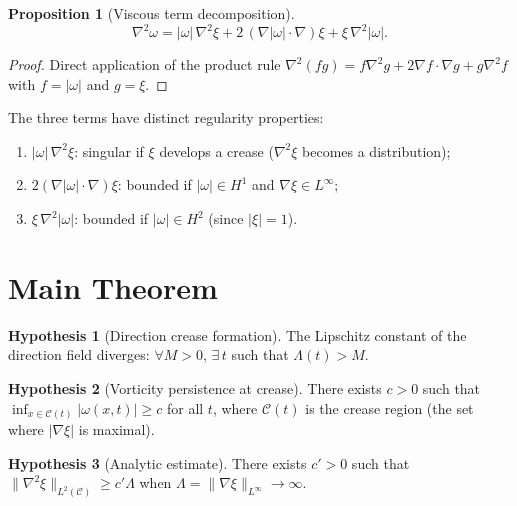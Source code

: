 \documentclass[11pt,a4paper]{article}
\newtheorem{proposition}[theorem]{Proposition}
\theoremstyle{definition}
\newtheorem{hypothesis}{Hypothesis}
\newcommand{\grad}{\nabla}
\newcommand{\lapl}{\nabla^2}
\newcommand{\norm}[1]{\lVert #1 \rVert}
\newcommand{\abs}[1]{\lvert #1 \rvert}
\begin{document}
\begin{proposition}[Viscous term decomposition]\label{prop:product}
\begin{equation}\label{eq:product}
  \lapl\omega
    = \abs{\omega}\,\lapl\xi
    + 2\,(\grad\abs{\omega}\cdot\grad)\xi
    + \xi\,\lapl\abs{\omega}.
\end{equation}
\end{proposition}
\begin{proof}
Direct application of the product rule
$\lapl(fg)=f\lapl g+2\grad f\cdot\grad g+g\lapl f$
with $f=\abs{\omega}$ and $g=\xi$.
\end{proof}

The three terms have distinct regularity properties:
\begin{enumerate}[label=(\roman*)]
  \item $\abs{\omega}\,\lapl\xi$: singular if $\xi$ develops a crease
        ($\lapl\xi$ becomes a distribution);
  \item $2(\grad\abs{\omega}\cdot\grad)\xi$: bounded if
        $\abs{\omega}\in H^1$ and $\grad\xi\in L^\infty$;
  \item $\xi\,\lapl\abs{\omega}$: bounded if
        $\abs{\omega}\in H^2$ (since $\abs{\xi}=1$).
\end{enumerate}

\section{Main Theorem}\label{sec:main}

\begin{hypothesis}[Direction crease formation]\label{hyp:H1}
The Lipschitz constant of the direction field diverges:
$\forall M>0$, $\exists\, t$ such that $\Lambda(t)>M$.
\end{hypothesis}

\begin{hypothesis}[Vorticity persistence at crease]\label{hyp:H2}
There exists $c>0$ such that
$\inf_{x\in\mathcal{C}(t)}\abs{\omega(x,t)}\geq c$
for all $t$, where $\mathcal{C}(t)$ is the crease region (the set
where $\abs{\grad\xi}$ is maximal).
\end{hypothesis}

\begin{hypothesis}[Analytic estimate]\label{hyp:H3}
There exists $c'>0$ such that
$\norm{\lapl\xi}_{L^2(\mathcal{C})}\geq c'\Lambda$ when
$\Lambda = \norm{\grad\xi}_{L^\infty}\to\infty$.
\end{hypothesis}
\end{document}
